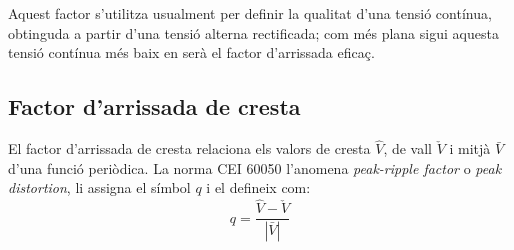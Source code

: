 Aquest factor s'utilitza usualment per definir la qualitat d'una
tensió contínua, obtinguda a partir  d'una tensió alterna rectificada; com més
plana sigui aquesta tensió contínua més baix en serà el factor
d'arrissada eficaç.

\subsection{Factor d'arrissada de cresta}

El factor d'arrissada de cresta relaciona els valors de cresta $\hat{V}$, de vall $\check{V}$  i mitjà $\bar{V}$
 d'una funció periòdica. La norma CEI 60050 l'anomena \textit{peak-ripple factor} o \textit{peak distortion}, li assigna el símbol $q$ i el defineix com:
\begin{equation}
    q = \frac{\hat{V} - \check{V}}{|\bar{V}|}
\end{equation}


